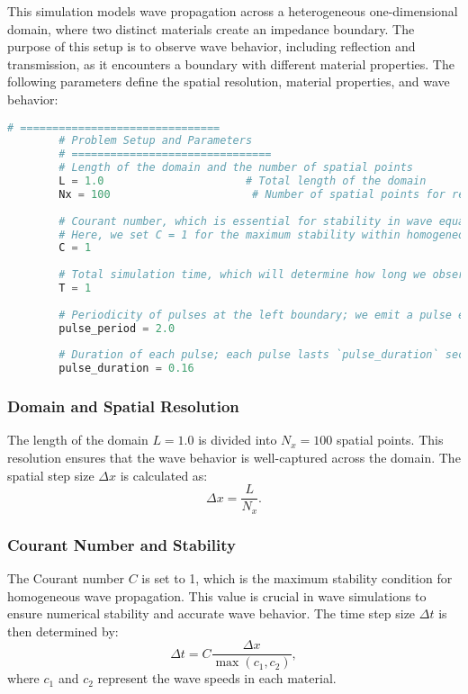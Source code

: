 \documentclass{article}
\begin{document}
		This simulation models wave propagation across a heterogeneous one-dimensional domain, where two distinct materials create an impedance boundary. The purpose of this setup is to observe wave behavior, including reflection and transmission, as it encounters a boundary with different material properties. The following parameters define the spatial resolution, material properties, and wave behavior:
		\begin{lstlisting}[language=Python]
		# ===============================
		# Problem Setup and Parameters
		# ===============================
		# Length of the domain and the number of spatial points
		L = 1.0                      # Total length of the domain
		Nx = 100                      # Number of spatial points for resolution
		
		# Courant number, which is essential for stability in wave equations.
		# Here, we set C = 1 for the maximum stability within homogeneous regions.
		C = 1
		
		# Total simulation time, which will determine how long we observe the wave motion.
		T = 1
		
		# Periodicity of pulses at the left boundary; we emit a pulse every `pulse_period` seconds.
		pulse_period = 2.0
		
		# Duration of each pulse; each pulse lasts `pulse_duration` seconds.
		pulse_duration = 0.16
		\end{lstlisting}
		
		\subsubsection{Domain and Spatial Resolution}
		
		The length of the domain \( L = 1.0 \) is divided into \( N_x = 100 \) spatial points. This resolution ensures that the wave behavior is well-captured across the domain. The spatial step size \( \Delta x \) is calculated as:
		\[
		\Delta x = \frac{L}{N_x}.
		\]
		
		\subsubsection{Courant Number and Stability}
		
		The Courant number \( C \) is set to 1, which is the maximum stability condition for homogeneous wave propagation. This value is crucial in wave simulations to ensure numerical stability and accurate wave behavior. The time step size \( \Delta t \) is then determined by:
		\[
		\Delta t = C \frac{\Delta x}{\max(c_1, c_2)},
		\]
		where \( c_1 \) and \( c_2 \) represent the wave speeds in each material.
		
\end{document}
